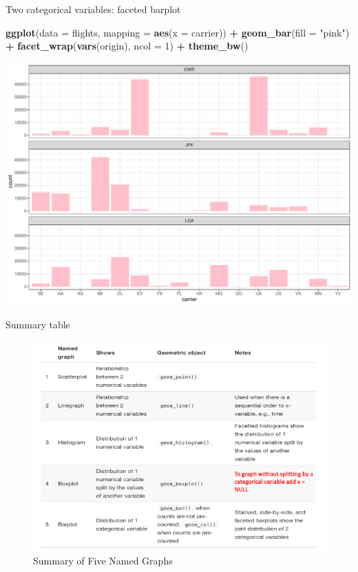 \documentclass[
  ignorenonframetext,
]{beamer}
\newenvironment{Shaded}{\begin{snugshade}}{\end{snugshade}}
\newcommand{\AttributeTok}[1]{\textcolor[rgb]{0.13,0.29,0.53}{#1}}
\newcommand{\DecValTok}[1]{\textcolor[rgb]{0.00,0.00,0.81}{#1}}
\newcommand{\FunctionTok}[1]{\textcolor[rgb]{0.13,0.29,0.53}{\textbf{#1}}}
\newcommand{\NormalTok}[1]{#1}
\newcommand{\SpecialCharTok}[1]{\textcolor[rgb]{0.81,0.36,0.00}{\textbf{#1}}}
\newcommand{\StringTok}[1]{\textcolor[rgb]{0.31,0.60,0.02}{#1}}
\begin{document}
\begin{frame}[fragile]{Two categorical variables: faceted barplot}
\protect\hypertarget{two-categorical-variables-faceted-barplot}{}
\tiny

\begin{Shaded}
\begin{Highlighting}[]
\FunctionTok{ggplot}\NormalTok{(}\AttributeTok{data =}\NormalTok{ flights, }\AttributeTok{mapping =} \FunctionTok{aes}\NormalTok{(}\AttributeTok{x =}\NormalTok{ carrier)) }\SpecialCharTok{+}
  \FunctionTok{geom\_bar}\NormalTok{(}\AttributeTok{fill =} \StringTok{"pink"}\NormalTok{) }\SpecialCharTok{+}
  \FunctionTok{facet\_wrap}\NormalTok{(}\FunctionTok{vars}\NormalTok{(origin), }\AttributeTok{ncol =} \DecValTok{1}\NormalTok{) }\SpecialCharTok{+} 
  \FunctionTok{theme\_bw}\NormalTok{()}
\end{Highlighting}
\end{Shaded}

\begin{center}\includegraphics[width=0.7\linewidth,height=0.6\textheight]{Week2_Lect_files/figure-beamer/unnamed-chunk-46-1} \end{center}
\normalsize
\end{frame}

\begin{frame}{Summary table}
\protect\hypertarget{summary-table}{}
\begin{figure}[h]

{\centering \includegraphics[width=0.8\linewidth,height=0.7\textheight]{week2_5} 

}

\caption{Summary of Five Named Graphs}\label{fig:5NG}
\end{figure}
\end{frame}
\end{document}
